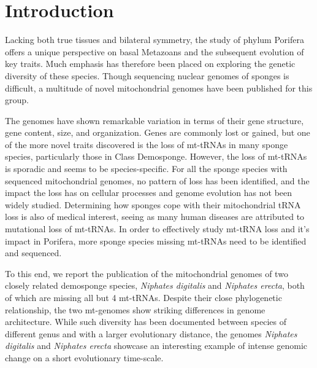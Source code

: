 \documentclass[../main.tex]{subfiles}
\begin{document}
\newpage
\section{Introduction}
Lacking both true tissues and bilateral symmetry, the study of phylum Porifera offers a unique perspective on basal Metazoans and the subsequent evolution of key traits. Much emphasis has therefore been placed on exploring the genetic diversity of these species. Though sequencing nuclear genomes of sponges is difficult, a multitude of novel mitochondrial genomes have been published for this group.

The genomes have shown remarkable variation in terms of their gene structure, gene content, size, and organization. Genes are commonly lost or gained, but one of the more novel traits discovered is the loss of mt-tRNAs in many sponge species, particularly those in Class Demosponge. However, the loss of mt-tRNAs is sporadic and seems to be species-specific. For all the sponge species with sequenced mitochondrial genomes, no pattern of loss has been identified, and the impact the loss has on cellular processes and genome evolution has not been widely studied. Determining how sponges cope with their mitochondrial tRNA loss is also of medical interest, seeing as many human diseases are attributed to mutational loss of mt-tRNAs. In order to effectively study mt-tRNA loss and it's impact in Porifera, more sponge species missing mt-tRNAs need to be identified and sequenced.

To this end, we report the publication of the mitochondrial genomes of two closely related demosponge species, \emph{Niphates digitalis} and \emph{Niphates erecta}, both of which are missing all but 4 mt-tRNAs. Despite their close phylogenetic relationship, the two mt-genomes show striking differences in genome architecture. While such diversity has been documented between species of different genus and with a larger evolutionary distance, the genomes \emph{Niphates digitalis} and \emph{Niphates erecta} showcase an interesting example of intense genomic change on a short evolutionary time-scale. 
\end{document}
